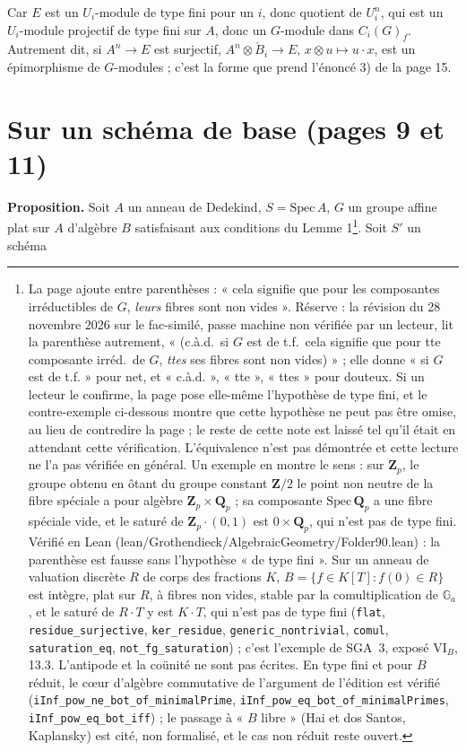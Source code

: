 \documentclass[11pt,a4paper]{article}
\begin{document}
Car $E$ est un $U_i$-module de type fini pour un $i$, donc quotient de
$U_i^{n}$, qui est un $U_i$-module projectif de type fini sur $A$, donc un
$G$-module dans $C_i(G)_f$. Autrement dit, si $A^{n} \to E$ est surjectif,
$A^{n} \otimes \check{B}_i \to E$, $x \otimes u \mapsto u \cdot x$, est
un épimorphisme de $G$-modules ; c'est la forme que prend l'énoncé 3) de la
page 15.

\section*{Sur un schéma de base (pages 9 et 11)}

\textbf{Proposition.} Soit $A$ un anneau de Dedekind, $S = \mathrm{Spec}\,A$,
$G$ un groupe affine plat sur $A$ d'algèbre $B$ satisfaisant aux conditions
du Lemme 1\footnote{La page ajoute entre parenthèses : « cela signifie que
pour les composantes irréductibles de $G$, \emph{leurs} fibres sont non
vides ». Réserve : la révision du 28 novembre 2026 sur le fac-similé, passe machine non vérifiée par un lecteur, lit la parenthèse autrement,
« (c.à.d.\ si $G$ est de t.f.\ cela signifie que pour tte composante irréd.\
de $G$, \emph{ttes} ses fibres sont non vides) » ; elle donne « si $G$ est de
t.f. » pour net, et « c.à.d. », « tte », « ttes » pour douteux. Si un lecteur le
confirme, la page pose elle-même l'hypothèse de type fini, et le
contre-exemple ci-dessous montre que cette hypothèse ne peut pas être omise,
au lieu de contredire la page ; le reste de cette note est laissé tel qu'il
était en attendant cette vérification. L'équivalence n'est pas démontrée et cette lecture ne l'a pas
vérifiée en général. Un exemple en montre le sens : sur $\mathbf{Z}_p$, le
groupe obtenu en ôtant du groupe constant $\mathbf{Z}/2$ le point non
neutre de la fibre spéciale a pour algèbre $\mathbf{Z}_p \times
\mathbf{Q}_p$ ; sa composante $\mathrm{Spec}\,\mathbf{Q}_p$ a une fibre
spéciale vide, et le saturé de $\mathbf{Z}_p \cdot (0,1)$ est $0 \times
\mathbf{Q}_p$, qui n'est pas de type fini. Vérifié en Lean
(lean/Grothendieck/AlgebraicGeometry/Folder90.lean) : la parenthèse est fausse sans
l'hypothèse « de type fini ». Sur un anneau de valuation discrète $R$ de corps
des fractions $K$, $B = \{f \in K[T] : f(0) \in R\}$ est intègre, plat sur
$R$, à fibres non vides, stable par la comultiplication de $\mathbb{G}_a$, et
le saturé de $R \cdot T$ y est $K \cdot T$, qui n'est pas de type fini
(\texttt{flat}, \texttt{residue\_surjective}, \texttt{ker\_residue},
\texttt{generic\_nontrivial}, \texttt{comul}, \texttt{saturation\_eq},
\texttt{not\_fg\_saturation}) ; c'est l'exemple de SGA~3, exposé VI$_B$,
13.3. L'antipode et la coünité ne sont pas écrites. En type fini et pour
$B$ réduit, le cœur d'algèbre commutative de l'argument de l'édition est
vérifié (\texttt{iInf\_pow\_ne\_bot\_of\_minimalPrime},
\texttt{iInf\_pow\_eq\_bot\_of\_minimalPrimes},
\texttt{iInf\_pow\_eq\_bot\_iff}) ; le passage à « $B$ libre » (Hai et dos
Santos, Kaplansky) est cité, non formalisé, et le cas non réduit reste
ouvert.}. Soit $S'$ un schéma
\end{document}
